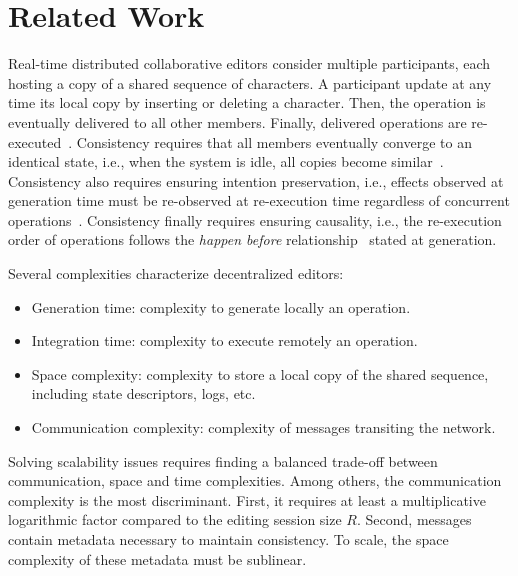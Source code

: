 \section{Related Work}
\label{sec:relatedwork}

Real-time distributed collaborative editors consider multiple
participants, each hosting a copy of a shared sequence of
characters. A participant update at any time its local copy by
inserting or deleting a character. Then, the operation is eventually
delivered to all other members. Finally, delivered operations are
re-executed~\cite{saito2005optimistic}. Consistency requires that all
members eventually converge to an identical state, i.e., when the
system is idle, all copies become
similar~\cite{bailis2013eventual}. Consistency also requires ensuring
intention preservation, i.e., effects observed at generation time must
be re-observed at re-execution time regardless of concurrent
operations~\cite{sun1998achieving}. Consistency finally requires
ensuring causality, i.e., the re-execution order of operations follows
the \emph{happen before} relationship~\cite{lamport1978time} stated at
generation.

Several complexities characterize decentralized editors:
\begin{itemize}
\item Generation time: complexity to generate locally an operation.
\item Integration time: complexity to execute remotely an operation.
\item Space complexity: complexity to store a local copy of the shared sequence,
  including state descriptors, logs, etc.
\item Communication complexity: complexity of messages transiting the network.
\end{itemize}
Solving scalability issues requires finding a balanced trade-off between
communication, space and time complexities.  Among others, the communication
complexity is the most discriminant. First, it requires at least a
multiplicative logarithmic factor compared to the editing session size
$R$. Second, messages contain metadata necessary to maintain consistency. To
scale, the space complexity of these metadata must be sublinear.

